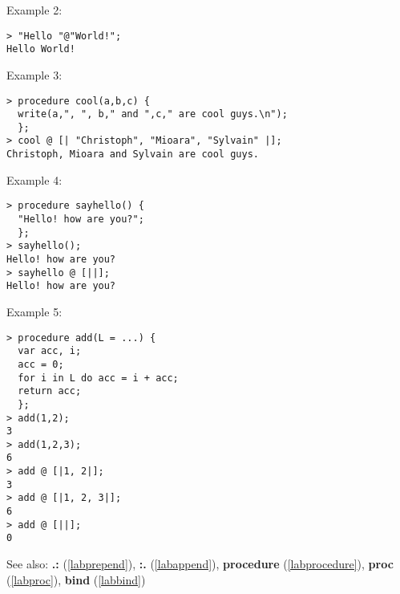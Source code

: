 \noindent Example 2: 
\begin{center}\begin{minipage}{15cm}\begin{Verbatim}[frame=single]
> "Hello "@"World!";
Hello World!
\end{Verbatim}
\end{minipage}\end{center}
\noindent Example 3: 
\begin{center}\begin{minipage}{15cm}\begin{Verbatim}[frame=single]
> procedure cool(a,b,c) { 
  write(a,", ", b," and ",c," are cool guys.\n");
  };
> cool @ [| "Christoph", "Mioara", "Sylvain" |];
Christoph, Mioara and Sylvain are cool guys.
\end{Verbatim}
\end{minipage}\end{center}
\noindent Example 4: 
\begin{center}\begin{minipage}{15cm}\begin{Verbatim}[frame=single]
> procedure sayhello() { 
  "Hello! how are you?";
  };
> sayhello();
Hello! how are you?
> sayhello @ [||];
Hello! how are you?
\end{Verbatim}
\end{minipage}\end{center}
\noindent Example 5: 
\begin{center}\begin{minipage}{15cm}\begin{Verbatim}[frame=single]
> procedure add(L = ...) {
  var acc, i;
  acc = 0;
  for i in L do acc = i + acc;
  return acc;
  };
> add(1,2);
3
> add(1,2,3);
6
> add @ [|1, 2|];
3
> add @ [|1, 2, 3|];
6
> add @ [||];
0
\end{Verbatim}
\end{minipage}\end{center}
See also: \textbf{.:} (\ref{labprepend}), \textbf{:.} (\ref{labappend}), \textbf{procedure} (\ref{labprocedure}), \textbf{proc} (\ref{labproc}), \textbf{bind} (\ref{labbind})
